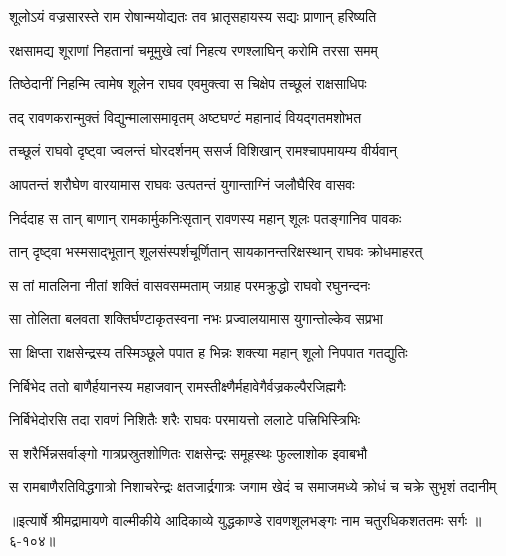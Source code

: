 \twolineshloka
{शूलोऽयं वज्रसारस्ते राम रोषान्मयोद्यतः}
{तव भ्रातृसहायस्य सद्यः प्राणान् हरिष्यति} %

\twolineshloka
{रक्षसामद्य शूराणां निहतानां चमूमुखे}
{त्वां निहत्य रणश्लाघिन् करोमि तरसा समम्} %

\twolineshloka
{तिष्ठेदानीं निहन्मि त्वामेष शूलेन राघव}
{एवमुक्त्वा स चिक्षेप तच्छूलं राक्षसाधिपः} %

\twolineshloka
{तद् रावणकरान्मुक्तं विद्युन्मालासमावृतम्}
{अष्टघण्टं महानादं वियद्गतमशोभत} %

\twolineshloka
{तच्छूलं राघवो दृष्ट्वा ज्वलन्तं घोरदर्शनम्}
{ससर्ज विशिखान् रामश्चापमायम्य वीर्यवान्} %

\twolineshloka
{आपतन्तं शरौघेण वारयामास राघवः}
{उत्पतन्तं युगान्ताग्निं जलौघैरिव वासवः} %

\twolineshloka
{निर्ददाह स तान् बाणान् रामकार्मुकनिःसृतान्}
{रावणस्य महान् शूलः पतङ्गानिव पावकः} %

\twolineshloka
{तान् दृष्ट्वा भस्मसाद्भूतान् शूलसंस्पर्शचूर्णितान्}
{सायकानन्तरिक्षस्थान् राघवः क्रोधमाहरत्} %

\twolineshloka
{स तां मातलिना नीतां शक्तिं वासवसम्मताम्}
{जग्राह परमक्रुद्धो राघवो रघुनन्दनः} %

\twolineshloka
{सा तोलिता बलवता शक्तिर्घण्टाकृतस्वना}
{नभः प्रज्वालयामास युगान्तोल्केव सप्रभा} %

\twolineshloka
{सा क्षिप्ता राक्षसेन्द्रस्य तस्मिञ्छूले पपात ह}
{भिन्नः शक्त्या महान् शूलो निपपात गतद्युतिः} %

\twolineshloka
{निर्बिभेद ततो बाणैर्हयानस्य महाजवान्}
{रामस्तीक्ष्णैर्महावेगैर्वज्रकल्पैरजिह्मगैः} %

\twolineshloka
{निर्बिभेदोरसि तदा रावणं निशितैः शरैः}
{राघवः परमायत्तो ललाटे पत्त्रिभिस्त्रिभिः} %

\twolineshloka
{स शरैर्भिन्नसर्वाङ्गो गात्रप्रस्रुतशोणितः}
{राक्षसेन्द्रः समूहस्थः फुल्लाशोक इवाबभौ} %

\twolineshloka
{स रामबाणैरतिविद्धगात्रो निशाचरेन्द्रः क्षतजार्द्रगात्रः}
{जगाम खेदं च समाजमध्ये क्रोधं च चक्रे सुभृशं तदानीम्} %


॥इत्यार्षे श्रीमद्रामायणे वाल्मीकीये आदिकाव्ये युद्धकाण्डे रावणशूलभङ्गः नाम चतुरधिकशततमः सर्गः ॥६-१०४॥

